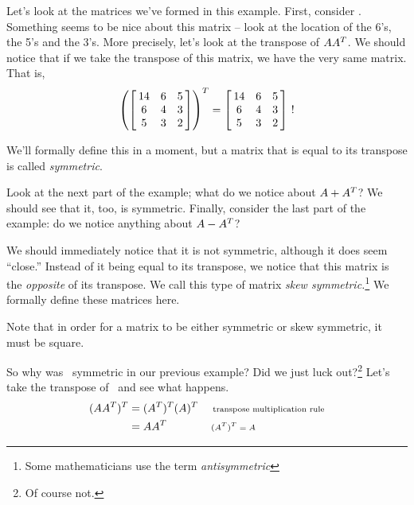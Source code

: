 Let's look at the matrices we've formed in this example. First, consider \tta\ttat. Something seems to be nice about this matrix -- look at the location of the 6's, the 5's and the 3's. More precisely, let's look at the transpose of $AA^T$. We should notice that if we take the transpose of this matrix, we have the very same matrix. That is, $$\left(\bmx{ccc}14 & 6 & 5\\ 6&4&3\\ 5& 3& 2\emx\right)^T = \bmx{ccc}14 & 6 & 5\\ 6&4&3\\ 5& 3& 2\emx\ !$$

We'll formally define this in a moment, but a matrix that is equal to its transpose is called \textit{symmetric}. 

Look at the next part of the example; what do we notice about $A+A^T$? We should see that it, too, is symmetric. Finally, consider the last part of the example: do we notice anything about $A-A^T$? 

We should immediately notice that it is not symmetric, although it does seem ``close.'' Instead of it being equal to its transpose, we notice that this matrix is the \textit{opposite} of its transpose. We call this type of matrix \textit{skew symmetric.}\footnote{Some mathematicians use the term \textit{antisymmetric}}  We formally define these matrices here.


Note that in order for a matrix to be either symmetric or skew symmetric, it must be square.

So why was \tta\ttat\ symmetric in our previous example? Did we just luck out?\footnote{Of course not.} Let's take the transpose of \tta\ttat\ and see what happens.
\begin{align*}
	(AA^T)^T &= (A^T)^T(A)^T \quad\ \text{\scriptsize transpose multiplication rule} \\
								&=	AA^T	\quad\quad \quad\quad \text{\scriptsize $(A^T)^T = A$}
\end{align*}

